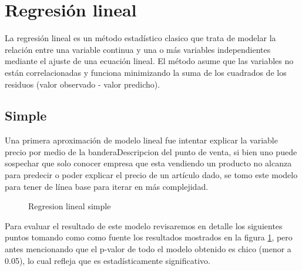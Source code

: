 \section{Regresión lineal}

La regresión lineal es un método estadístico clasico que trata de modelar la relación entre una variable continua y una o más variables independientes mediante el ajuste de una ecuación lineal. El método asume que las variables no están correlacionadas y funciona minimizando la suma de los cuadrados de los residuos (valor observado - valor predicho). 



\subsection{Simple}



Una primera aproximación de modelo lineal fue intentar explicar la variable precio por medio de la banderaDescripcion del punto de venta, si bien uno puede sospechar que solo conocer empresa que esta vendiendo un producto no alcanza para predecir o poder explicar el precio de un artículo dado, se tomo este modelo para tener de línea base para iterar en más complejidad.\\

\begin{figure}[h]
\centering
{}%
\caption{Regresion lineal simple}
\label{ln_simple_full}
\end{figure}



Para evaluar el resultado de este modelo revisaremos en detalle los siguientes puntos tomando como como fuente los resultados mostrados en la figura \ref{ln_simple_full}, pero antes mencionando que el p-valor de todo el modelo obtenido es chico (menor a 0.05), lo cual refleja que es estadísticamente significativo.\\

